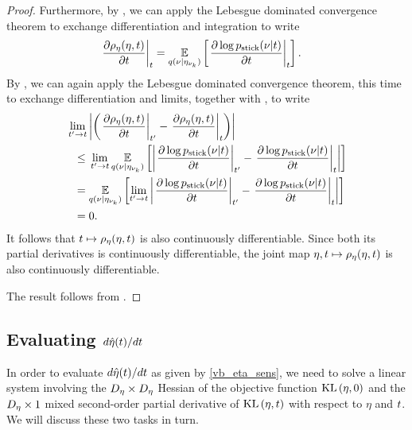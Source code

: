\begin{thm}
\begin{proof}
Furthermore, by , we can apply
the Lebesgue dominated convergence theorem to exchange differentiation and
integration to write
%
\begin{align*}
%
\fracat{\partial \rho_\eta(\eta, \t)}{\partial\t}{\t} ={}&
    \expect{\q(\nu \vert \etanuk)}{
        \fracat{\partial \log \pstick(\nu \vert \t)}{\partial \t}{\t}
    }.
%
\end{align*}
%
By , we can again apply the
Lebesgue dominated convergence theorem, this time to exchange differentiation
and limits, together with , to
write
%
\begin{align*}
%
\MoveEqLeft
\lim_{\t' \rightarrow \t} \abs{\left(
    \fracat{\partial \rho_\eta(\eta, \t)}{\partial\t}{\t'} -
    \fracat{\partial \rho_\eta(\eta, \t)}{\partial\t}{\t} \right)}
\\\le{}&
\lim_{\t' \rightarrow \t}
\expect{\q(\nu \vert \etanuk)}{\abs{
    \fracat{\partial \log \pstick(\nu \vert \t)}{\partial \t}{\t'} -
    \fracat{\partial \log \pstick(\nu \vert \t)}{\partial \t}{\t}
}}
\\={}&
\expect{\q(\nu \vert \etanuk)}{\lim_{\t' \rightarrow \t} \abs{
    \fracat{\partial \log \pstick(\nu \vert \t)}{\partial \t}{\t'} -
    \fracat{\partial \log \pstick(\nu \vert \t)}{\partial \t}{\t}
}}
\\={}& 0.
%
\end{align*}
%
It follows that $t \mapsto \rho_\eta(\eta, t)$ is also continuously
differentiable.  Since both its partial derivatives is continuously
differentiable, the joint map $\eta, t \mapsto \rho_\eta(\eta, t)$
is also continuously differentiable.




The result follows from \citet[Theorem 3.3.1]{krantz:2012:implicit}.
%
\end{proof}
%
\end{thm}


\subsection{Evaluating $d\hat\eta(t) / dt$}

In order to evaluate $d\hat\eta(t) / dt$ as given by \eqref{vb_eta_sens}, we
need to solve a linear system involving the ${D_{\eta}} \times {D_{\eta}}$ Hessian of
the objective function $\mathrm{KL}\left(\eta, 0\right)$ and the ${D_{\eta}} \times 1$ mixed
second-order partial derivative of $\mathrm{KL}\left(\eta, t\right)$ with respect to $\eta$ and
$t$.  We will discuss these two tasks in turn.

